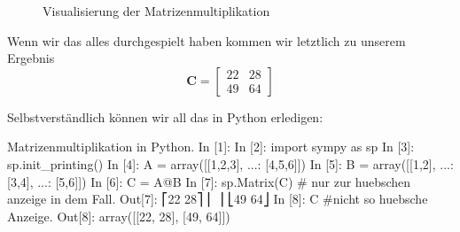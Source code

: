 \begin{figure}[H]
\centering
{}
\caption{Visualisierung der Matrizenmultiplikation}
    \label{fig:matrixMultColored}
\end{figure}



Wenn wir das alles durchgespielt haben kommen wir letztlich zu unserem Ergebnis
\begin{equation}
\mathbf{C} = \left[\begin{matrix}22 & 28\\49 & 64\end{matrix}\right]
\end{equation}


Selbstverständlich können wir all das in Python erledigen:

\begin{python}{Matrizenmultiplikation in Python.}
In [1]: %
In [2]: import sympy as sp
In [3]: sp.init_printing()
In [4]: A = array([[1,2,3],
   ...:             [4,5,6]])
In [5]: B = array([[1,2],
   ...: [3,4],
   ...: [5,6]])
In [6]: C = A@B
In [7]: sp.Matrix(C) # nur zur huebschen anzeige in dem Fall.
Out[7]:
⎡22  28⎤
⎢      ⎥
⎣49  64⎦
In [8]: C #nicht so huebsche Anzeige.
Out[8]:
array([[22, 28],
       [49, 64]])
\end{python}

